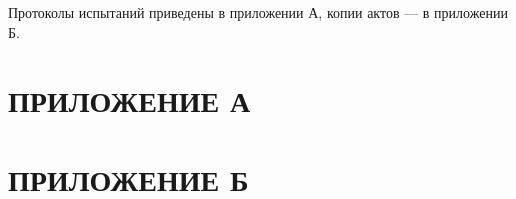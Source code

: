 

Протоколы испытаний приведены в приложении А, копии актов — в приложении Б.

\section*{ПРИЛОЖЕНИЕ А}

\section*{ПРИЛОЖЕНИЕ Б}


